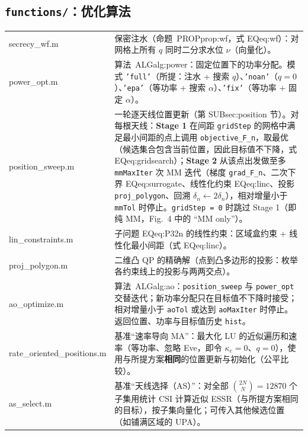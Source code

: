 \documentclass[11pt,a4paper]{ctexart}
\newcommand{\code}[1]{\texttt{#1}}
\begin{document}
\subsection{\code{functions/}：优化算法}
\begin{longtable}{>{\ttfamily\small}p{4.6cm}p{11.2cm}}
\toprule
secrecy\_wf.m & 保密注水（命题~PROP{prop:wf}，式 EQ{eq:wf}）：对网格上所有 $q$ 同时二分求水位 $\nu$（向量化）。\\
power\_opt.m & 算法~ALG{alg:power}：固定位置下的功率分配。模式 \code{'full'}（所提：注水 + 搜索 $q$）、\code{'noan'}（$q=0$）、\code{'epa'}（等功率 + 搜索 $\alpha$）、\code{'fix'}（等功率 + 固定 $\alpha$）。\\
position\_sweep.m & 一轮逐天线位置更新（第 SUB{sec:position} 节）。对每根天线：\textbf{Stage 1} 在间距 \code{gridStep} 的网格中满足最小间距的点上调用 \code{objective\_F\_n}，取最优（候选集合包含当前位置，因此目标值不下降，式 EQ{eq:gridsearch}）；\textbf{Stage 2} 从该点出发做至多 \code{mmMaxIter} 次 MM 迭代（梯度 \code{grad\_F\_n}、二次下界 EQ{eq:surrogate}、线性化约束 EQ{eq:linc}、投影 \code{proj\_polygon}、回溯 $\delta_n\leftarrow2\delta_n$），相对增量小于 \code{mmTol} 时停止。\code{gridStep = 0} 时跳过 Stage 1（即纯 MM，Fig.~4 中的 “MM only”）。\\
lin\_constraints.m & 子问题 EQ{eq:P32n} 的线性约束：区域盒约束 + 线性化最小间距（式 EQ{eq:linc}）。\\
proj\_polygon.m & 二维凸 QP 的精确解（点到凸多边形的投影：枚举各约束线上的投影与两两交点）。\\
ao\_optimize.m & 算法~ALG{alg:ao}：\code{position\_sweep} 与 \code{power\_opt} 交替迭代；新功率分配只在目标值不下降时接受；相对增量小于 \code{aoTol} 或达到 \code{aoMaxIter} 时停止。返回位置、功率与目标值历史 \code{hist}。\\
rate\_oriented\_positions.m & 基准“速率导向 MA”：最大化 LU 的近似遍历和速率（等功率、忽略 Eve，即令 $\kappa_e=0$、$q=0$），使用与所提方案\textbf{相同}的位置更新与初始化（公平比较）。\\
as\_select.m & 基准“天线选择（AS）”：对全部 $\binom{2N}{N}=12870$ 个子集用统计 CSI 计算近似 ESSR（与所提方案相同的目标），按子集向量化；可传入其他候选位置（如铺满区域的 UPA）。\\
\bottomrule
\end{longtable}
\end{document}

